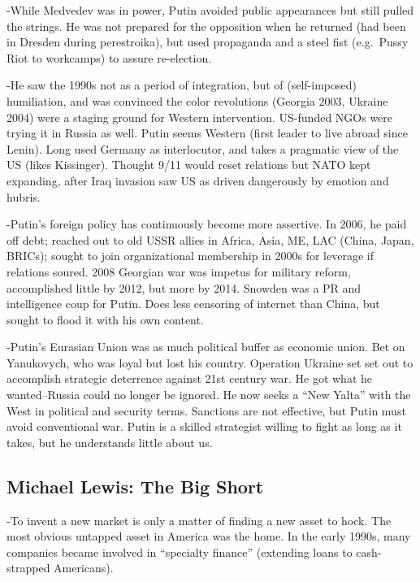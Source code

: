 \documentclass[
]{article}
\begin{document}
-While Medvedev was in power, Putin avoided public appearances but still
pulled the strings. He was not prepared for the opposition when he
returned (had been in Dresden during perestroika), but used propaganda
and a steel fist (e.g.~Pussy Riot to workcamps) to assure re-election.

-He saw the 1990s not as a period of integration, but of (self-imposed)
humiliation, and was convinced the color revolutions (Georgia 2003,
Ukraine 2004) were a staging ground for Western intervention. US-funded
NGOs were trying it in Russia as well. Putin seems Western (first leader
to live abroad since Lenin). Long used Germany as interlocutor, and
takes a pragmatic view of the US (likes Kissinger). Thought 9/11 would
reset relations but NATO kept expanding, after Iraq invasion saw US as
driven dangerously by emotion and hubris.

-Putin's foreign policy has continuously become more assertive. In 2006,
he paid off debt; reached out to old USSR allies in Africa, Asia, ME,
LAC (China, Japan, BRICs); sought to join organizational membership in
2000s for leverage if relations soured. 2008 Georgian war was impetus
for military reform, accomplished little by 2012, but more by 2014.
Snowden was a PR and intelligence coup for Putin. Does less censoring of
internet than China, but sought to flood it with his own content.

-Putin's Eurasian Union was as much political buffer as economic union.
Bet on Yanukovych, who was loyal but lost his country. Operation Ukraine
set set out to accomplish strategic deterrence against 21st century war.
He got what he wanted--Russia could no longer be ignored. He now seeks a
``New Yalta'' with the West in political and security terms. Sanctions
are not effective, but Putin must avoid conventional war. Putin is a
skilled strategist willing to fight as long as it takes, but he
understands little about us.

\hypertarget{michael-lewis-the-big-short}{%
\subsection{Michael Lewis: The Big
Short}\label{michael-lewis-the-big-short}}

-To invent a new market is only a matter of finding a new asset to hock.
The most obvious untapped asset in America was the home. In the early
1990s, many companies became involved in ``specialty finance''
(extending loans to cash-strapped Americans).
\end{document}
